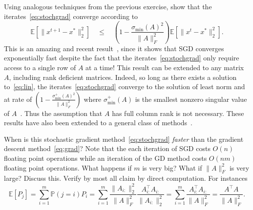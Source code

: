 \documentclass[11pt]{article}
\newcommand{\E}[1]{\mathbb{E}\left[#1\right] }
\newcommand{\norm}[1]{\lVert#1\rVert}
\begin{document}
\begin{ExerciseList}
\ExePart \label{II} 
Using analogous techniques from the previous exercise, show that the iterates~\eqref{eq:stochgrad} converge according to
\begin{equation}
\E{\norm{x^{t+1}-x^*}_2^2} \quad \leq  \quad\left(1- \frac{\sigma_{\min}(A)^2}{\norm{A}_F^2} \right) \E{\norm{x^{t}-x^*}_2^2}.
\end{equation}
This is an amazing and recent result~\cite{Strohmer2009}, since it shows that SGD converges exponentially fast despite the fact that the iterates~\eqref{eq:stochgrad} only require access to a single row of $A$ at a time! This result can be extended to any matrix $A$, including rank deficient matrices. Indeed, so long as there exists a solution to~\eqref{eq:lin}, the  iterates~\eqref{eq:stochgrad} converge to the solution of least norm and at rate of $\left(1- \frac{\sigma_{\min}^+(A)^2}{\norm{A}_F^2} \right)$ where $\sigma_{\min}^+(A)$ is the smallest nonzero singular value of $A$~\cite{Gower2015c}. Thus the assumption that $A$ has full column rank is not necessary. These results have also been extended to a general class of methods~\cite{Gower2015}.

\ExePart \label{III} When is this stochastic gradient method~\eqref{eq:stochgrad} \emph{faster} than the gradient descent method~\eqref{eq:grad}?  Note that the each iteration of SGD costs $O(n)$ floating point operations while an iteration of the GD method costs $O(nm)$ floating point operations. What happens if $m$ is very big? What if $\norm{A}_F^2$ is very large?  Discuss this. 
    \Answer[ref={I}] Verify by  most all claim by direct computation. For instances
     \[ \E{P_j} = \sum_{i=1}^m \mathbb{P}(j=i) P_i = \sum_{i=1}^m \frac{\norm{A_{i:}}_2^2}{\norm{A}_F^2} \frac{A_{i:}^\top A_{i:}}{\norm{A_{i:}}_2^2} =  \sum_{i=1}^m\frac{A_{i:}^\top A_{i:}}{\norm{A}_F^2} = \frac{A^\top A}{\norm{A}_F^2}.\]
    

\end{ExerciseList}
\end{document}
